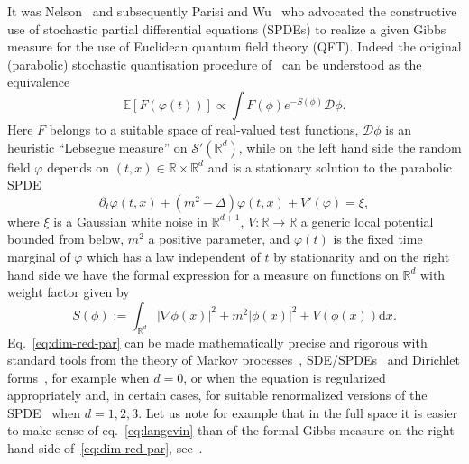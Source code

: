 \documentclass[a4paper,10pt]{article}
\newcommand{\assign}{:=}
\newcommand{\mathd}{\mathrm{d}}
\begin{document}
It was Nelson~{\cite{nelson1966,MR0214150,Nelson1973}} and subsequently
Parisi and Wu~{\cite{parisi_perturbation_1981}} who advocated the constructive
use of stochastic partial differential equations (SPDEs) to realize a given
Gibbs measure for the use of Euclidean quantum field theory (QFT). Indeed the
original (parabolic) stochastic quantisation procedure
of~{\cite{parisi_perturbation_1981}} can be understood as the equivalence
\begin{equation}
  \mathbb{E} [F (\varphi (t))] \propto \int F (\phi) e^{- S (\phi)}
  \mathcal{D} \phi \label{eq:dim-red-par} .
\end{equation}
Here $F$ belongs to a suitable space of real-valued test functions,
$\mathcal{D} \phi$ is an heuristic ``Lebsegue measure'' on $\mathcal{S}'
(\mathbb{R}^d)$, while on the left hand side the random field $\varphi$
depends on $(t, x) \in \mathbb{R} \times \mathbb{R}^d$ and is a stationary
solution to the parabolic SPDE
\begin{equation}
  \partial_t \varphi (t, x) + (m^2 - \Delta) \varphi (t, x) + V' (\varphi) =
  \xi \label{eq:langevin},
\end{equation}
where $\xi$ is a Gaussian white noise in $\mathbb{R}^{d + 1}$, $V : \mathbb{R}
\rightarrow \mathbb{R}$ a generic local potential bounded from below, $m^2$ a
positive parameter, and $\varphi (t)$ is the fixed time marginal of $\varphi$
which has a law independent of $t$ by stationarity and on the right hand side
we have the formal expression for a measure on functions on $\mathbb{R}^d$
with weight factor given by
\begin{equation}
  S (\phi) \assign \int_{\mathbb{R}^d} | \nabla \phi (x) |^2 + m^2 | \phi (x)
  |^2 + V (\phi (x)) \mathd x. \label{eq:action}
\end{equation}
Eq.~{\eqref{eq:dim-red-par}} can be made mathematically precise and rigorous
with standard tools from the theory of Markov
processes~{\cite{da_prato_stochastic_2008,krylov_stochastic_1999,prato_kolmogorov_2005}},
SDE/SPDEs~{\cite{khasminskii_stochastic_2011,Albeverio2017,MR2768734}} and
Dirichlet forms~{\cite{albeverio_stochastic_1991}}, for example when $d = 0$,
or when the equation is regularized appropriately and, in certain cases, for
suitable renormalized versions of the
SPDE~{\cite{Albeverio2002,albeverio_invariant_2017,Gallavotti1980,borkar_stochastic_1988,da_prato_strong_2003,GH18,hairer_discretisations_2018,hairer_tightness_2018,jona-lasinio_stochastic_1985,MW17,albeverio_strong_2012,iwata_infinite_1987}}
when $d = 1, 2, 3$. Let us note for example that in the full space it is
easier to make sense of eq.~{\eqref{eq:langevin}} than of the formal Gibbs
measure on the right hand side of~{\eqref{eq:dim-red-par}}, see~{\cite{GH18}}.
\end{document}
